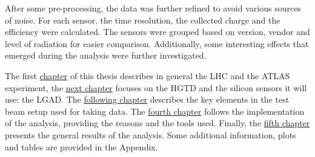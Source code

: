 After some pre-processing, the data was further refined to avoid various sources of noise. For each sensor, the time resolution, the collected charge and the efficiency were calculated. The sensors were grouped based on version, vendor and level of radiation for easier comparison. Additionally, some interesting effects that emerged during the analysis were further investigated.

The first \hyperref[chap:LHC_ATLAS]{chapter} of this thesis describes in general the LHC and the ATLAS experiment, the \hyperref[chap:HGTD_LGADs]{next chapter} focuses on the HGTD and the silicon sensors it will use: the LGAD. The \hyperref[chap:testbeam_setup]{following chapter} describes the key elements in the test beam setup used for taking data. The \hyperref[chap:analysis]{fourth chapter} follows the implementation of the analysis, providing the reasons and the tools used. Finally, the \hyperref[chap:results]{fifth chapter} presents the general results of the analysis. Some additional information, plots and tables are provided in the Appendix.

